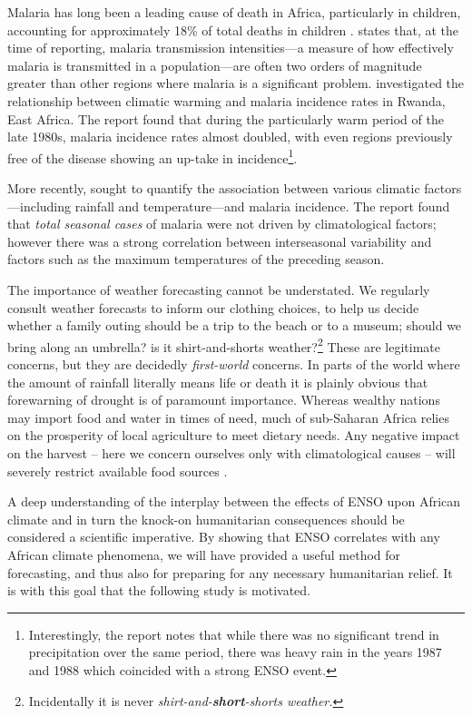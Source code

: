 Malaria has long been a leading cause of death in Africa, particularly in
children, accounting for approximately 18\% of total deaths in children
\citep{IMHE2016}. \citet{Alles1998} states that, at the time of reporting,
malaria transmission intensities---a measure of how effectively malaria is
transmitted in a population---are often two orders of magnitude greater than other
regions where malaria is a significant problem. \citet{loevinsohn1994}
investigated the relationship between climatic warming and malaria incidence
rates in Rwanda, East Africa. The report found that during the particularly warm
period of the late 1980s, malaria incidence rates almost doubled, with even
regions previously free of the disease showing an up-take in
incidence\footnote{Interestingly, the report notes that while there was no
  significant trend in precipitation over the same period, there was heavy rain
  in the years 1987 and 1988 which coincided with a strong ENSO event.}.

More recently, \cite{craig2004} sought to quantify the association between
various climatic factors---including rainfall and temperature---and malaria
incidence. The report found that \emph{total seasonal cases} of malaria were not
driven by climatological factors; however there was a strong correlation between
interseasonal variability and factors such as the maximum temperatures of the
preceding season.

\vspace{0.5cm}

The importance of weather forecasting cannot be understated. We regularly
consult weather forecasts to inform our clothing choices, to help us decide
whether a family outing should be a trip to the beach or to a museum; should we
bring along an umbrella? is it shirt-and-shorts weather?\footnote{Incidentally
  it is never \emph{shirt-and-\textbf{short}-shorts weather.}} These are
legitimate concerns, but they are decidedly \emph{first-world} concerns. In
parts of the world where the amount of rainfall literally means life or death it
is plainly obvious that forewarning of drought is of paramount importance.
Whereas wealthy nations may import food and water in times of need, much of
sub-Saharan Africa relies on the prosperity of local agriculture to meet dietary
needs. Any negative impact on the harvest -- here we concern ourselves only with
climatological causes -- will severely restrict available food sources
\citep{development2006mapping}.

A deep understanding of the interplay between the effects of ENSO upon African
climate and in turn the knock-on humanitarian consequences should be considered
a scientific imperative. By showing that ENSO correlates with any African
climate phenomena, we will have provided a useful method for forecasting, and
thus also for preparing for any necessary humanitarian relief. It is with this
goal that the following study is motivated.

